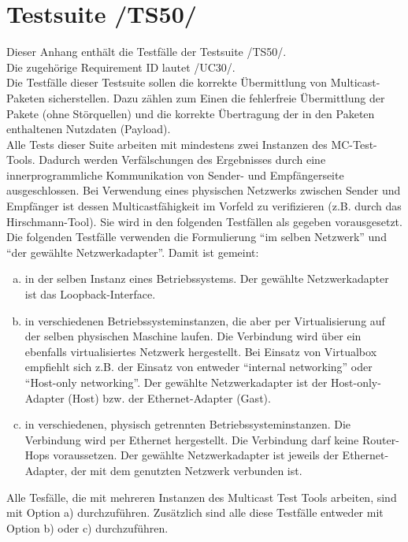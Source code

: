 \chapter{Testsuite /TS50/}

    Dieser Anhang enthält die Testfälle der Testsuite /TS50/.\\
    Die zugehörige Requirement ID lautet /UC30/.\\
    \newline
    Die Testfälle dieser Testsuite sollen die korrekte Übermittlung von
    Multicast-Paketen sicherstellen. Dazu zählen zum Einen die fehlerfreie
    Übermittlung der Pakete (ohne Störquellen) und die korrekte Übertragung der
    in den Paketen enthaltenen Nutzdaten (Payload).\\
    \newline
    Alle Tests dieser Suite arbeiten mit mindestens zwei Instanzen des
    MC-Test-Tools. Dadurch werden Verfälschungen des Ergebnisses durch eine
    innerprogrammliche Kommunikation von Sender- und Empfängerseite
    ausgeschlossen. Bei Verwendung eines physischen Netzwerks
    zwischen Sender und Empfänger ist dessen Multicastfähigkeit im Vorfeld zu
    verifizieren (z.B. durch das Hirschmann-Tool). Sie wird in den folgenden
    Testfällen als gegeben vorausgesetzt.\\
    \newline
    Die folgenden Testfälle verwenden die Formulierung "`im selben Netzwerk"'
    und "`der gewählte Netzwerkadapter"'. Damit ist gemeint:
    \begin{enumerate}[a)]
        \item in der selben Instanz eines Betriebssystems. Der gewählte
              Netzwerkadapter ist das Loopback-Interface.
        \item in verschiedenen Betriebssysteminstanzen, die aber per
              Virtualisierung auf der selben physischen Maschine laufen. Die
              Verbindung wird über ein ebenfalls virtualisiertes Netzwerk
              hergestellt. Bei Einsatz von Virtualbox empfiehlt sich z.B. der
              Einsatz von entweder "`internal networking"' oder "`Host-only
              networking"'. Der gewählte Netzwerkadapter ist der
              Host-only-Adapter (Host) bzw. der Ethernet-Adapter (Gast).
        \item in verschiedenen, physisch getrennten Betriebssysteminstanzen. Die
              Verbindung wird per Ethernet hergestellt. Die Verbindung darf
              keine Router-Hops voraussetzen. Der gewählte Netzwerkadapter ist
              jeweils der Ethernet-Adapter, der mit dem genutzten Netzwerk
              verbunden ist.
    \end{enumerate}
    Alle Tesfälle, die mit mehreren Instanzen des Multicast Test Tools arbeiten,
    sind mit Option a) durchzuführen. Zusätzlich sind alle diese Testfälle
    entweder mit Option b) oder c) durchzuführen.

